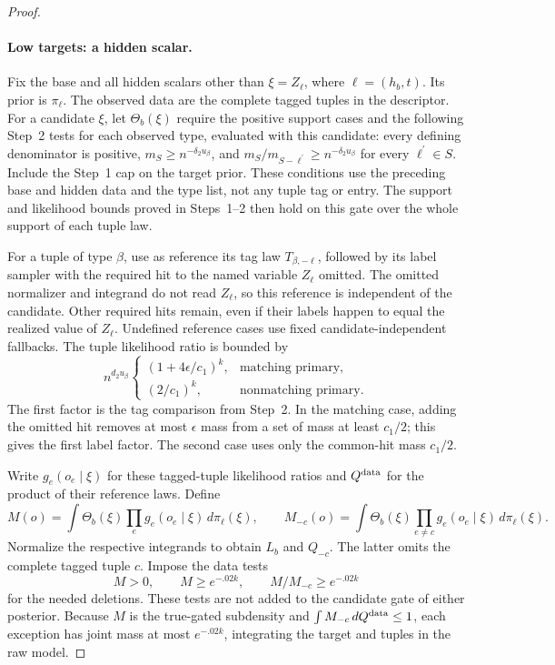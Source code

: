 \begin{proof}
\paragraph{Low targets: a hidden scalar.}
Fix the base and all hidden scalars other than
\(\xi=Z_\ell\), where \(\ell=(h_b,t)\). Its prior is \(\pi_\ell\).
The observed data are the complete tagged tuples in the descriptor.
For a candidate \(\xi\), let \(\Theta_b(\xi)\) require the positive
support cases and the following Step~2 tests for each observed type,
evaluated with this candidate: every defining denominator is positive,
\(m_S\ge n^{-\delta_2u_\beta}\), and \(m_S/m_{S-\ell^{\prime}}\ge n^{-\delta_2u_\beta}\)
for every \(\ell^{\prime}\in S\). Include the
Step~1 cap on the target prior. These conditions use the preceding base
and hidden data and the type list, not any tuple tag or entry.
The support and likelihood bounds proved in Steps~1--2 then hold on this
gate over the whole support of each tuple law.

For a tuple of type \(\beta\), use as reference its tag law
\(T_{\beta,-\ell}\), followed by its label sampler with the required
hit to the named variable \(Z_\ell\) omitted. The omitted normalizer
and integrand do not read \(Z_\ell\), so this reference is independent
of the candidate. Other required hits remain, even if their labels happen
to equal the realized value of \(Z_\ell\). Undefined reference cases
use fixed candidate-independent fallbacks.
The tuple likelihood ratio is bounded by
\[
 n^{d_2u_\beta}
 \begin{cases}
 (1+4\epsilon/c_1)^k,&\text{matching primary},\\
 (2/c_1)^k,&\text{nonmatching primary}.
 \end{cases}
\]
The first factor is the tag comparison from Step~2. In the matching case,
adding the omitted hit removes at most \(\epsilon\) mass from a set of
mass at least \(c_1/2\); this gives the first label factor. The second
case uses only the common-hit mass \(c_1/2\).

Write \(g_e(o_e\mid\xi)\) for these tagged-tuple likelihood ratios
and \(Q^{\rm data}\) for the product of their reference laws. Define
\[
 M(o)=\int\Theta_b(\xi)\prod_e g_e(o_e\mid\xi)\,d\pi_\ell(\xi),
 \qquad
 M_{-c}(o)=\int\Theta_b(\xi)\prod_{e\ne c}g_e(o_e\mid\xi)\,d\pi_\ell(\xi).
\]
Normalize the respective integrands to obtain \(L_b\) and \(Q_{-c}\).
The latter omits the complete tagged tuple \(c\). Impose the data tests
\[
 M>0,\qquad M\ge e^{-.02k},\qquad
 M/M_{-c}\ge e^{-.02k}
\]
for the needed deletions. These tests are not added to the candidate gate
of either posterior. Because \(M\) is the true-gated subdensity and
\(\int M_{-c}\,dQ^{\rm data}\le1\), each exception has joint mass at
most \(e^{-.02k}\), integrating the target and tuples in the raw model.


\end{proof}
